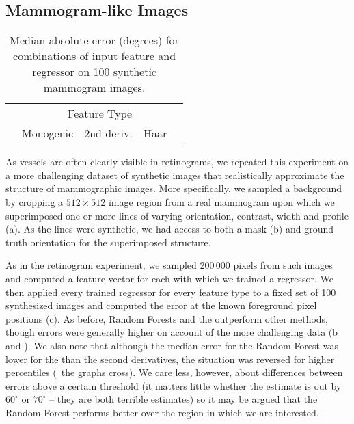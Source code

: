 \subsection{Mammogram-like Images}
\label{s:expts_synth_mammography}
\begin{table}[t]
\centering
\begin{tabular}{l|c c c c}
							& \multicolumn{4}{c}{Feature Type} \\
							& Monogenic		& 2nd deriv.	& Haar				& \dtcwt{} \\
\hline

\end{tabular}
%
\caption{Median absolute error (degrees) for combinations of input feature and regressor on 100 synthetic mammogram images.}
\label{t:synth_mammography}
\end{table}

As vessels are often clearly visible in retinograms, we repeated this experiment on a more challenging dataset of synthetic images that realistically approximate the structure of mammographic images. More specifically, we sampled a background by cropping a $512{\times}512$ image region from a real mammogram upon which we superimposed one or more lines of varying orientation, contrast, width and profile (a). As the lines were synthetic, we had access to both a mask (b) and ground truth orientation for the superimposed structure.

As in the retinogram experiment, we sampled 200\,000 pixels from such images and computed a feature vector for each with which we trained a regressor. We then applied every trained regressor for every feature type to a fixed set of 100 synthesized images and computed the error at the known foreground pixel positions (c). As before, Random Forests and the \dtcwt{} outperform other methods, though errors were generally higher on account of the more challenging data (b and ). We also note that although the median error for the Random Forest was lower for the \dtcwt{} than the second derivatives, the situation was reversed for higher percentiles (\ie~the graphs cross). We care less, however, about differences between errors above a certain threshold (it matters little whether the estimate is out by $60^\circ$ or $70^\circ$ -- they are both terrible estimates) so it may be argued that the Random Forest performs better over the region in which we are interested.

